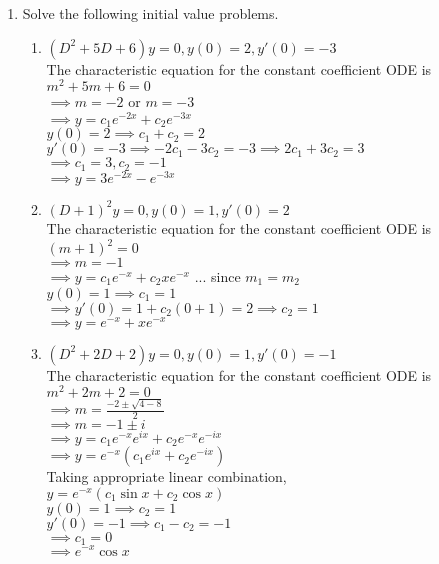 \documentclass[a4paper]{article}
\begin{document}
\begin{enumerate}
	\item Solve the following initial value problems.
	\begin{enumerate}
		\item $(D^2+5D+6)y=0, y(0)=2, y'(0)=-3$\\
			The characteristic equation for the constant coefficient ODE is\\
			$m^2+5m+6=0$\\
			$\implies m=-2$ or $m=-3$\\
			$\implies y=c_1e^{-2x}+c_2e^{-3x}$\\
			$y(0)=2 \implies c_1+c_2=2$\\
			$y'(0)=-3 \implies -2c_1-3c_2=-3 \implies 2c_1+3c_2=3$\\
			$\implies c_1=3, c_2=-1$\\
			$\implies y=3e^{-2x}-e^{-3x}$
			
		\item $(D+1)^2y=0, y(0)=1, y'(0)=2$\\
			The characteristic equation for the constant coefficient ODE is\\
			$(m+1)^2=0$\\
			$\implies m=-1$\\
			$\implies y=c_1e^{-x}+c_2xe^{-x}$ \hfill... since $m_1=m_2$ \\
			$y(0)=1 \implies c_1=1$\\
			$\implies y'(0)=1+c_2(0+1)=2 \implies c_2=1$\\
			$\implies y=e^{-x}+xe^{-x}$
			
		\item $(D^2+2D+2)y=0, y(0)=1, y'(0)=-1$\\
			The characteristic equation for the constant coefficient ODE is\\
			$m^2+2m+2=0$\\
			$\implies m=\frac{-2\pm\sqrt{4-8}}{2}$\\
			$\implies m=-1\pm i$\\
			$\implies y=c_1e^{-x}e^{ix} + c_2e^{-x}e^{-ix}$\\
			$\implies y=e^{-x}(c_1e^{ix} + c_2e^{-ix})$\\
			Taking appropriate linear combination,\\
			$y=e^{-x}(c_1\sin x + c_2\cos x)$\\
			$y(0)=1 \implies c_2=1$\\
			$y'(0)=-1 \implies c_1-c_2=-1$\\
			$\implies c_1=0$\\
			$\implies e^{-x}\cos x$
			

\end{enumerate}
\end{enumerate}
\end{document}
